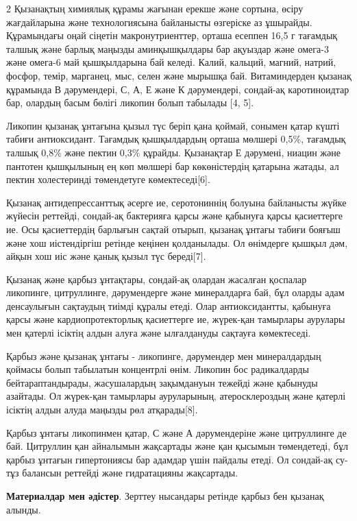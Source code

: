 \begin{multicols}{2}
Қызанақтың химиялық құрамы жағынан ерекше және сортына, өсіру
жағдайларына және технологиясына байланысты өзгеріске аз ұшырайды.
Құрамындағы оңай сіңетін макронутриенттер, орташа есеппен 16,5 г
тағамдық талшық және барлық маңызды аминқышқылдары бар ақуыздар және
омега-3 және омега-6 май қышқылдарына бай келеді. Калий, кальций,
магний, натрий, фосфор, темір, марганец, мыс, селен және мырышқа бай.
Витаминдерден қызанақ құрамында В дәрумендері, С, А, Е және К
дәрумендері, сондай-ақ каротиноидтар бар, олардың басым бөлігі ликопин
болып табылады {[}4, 5{]}.

Ликопин қызанақ ұнтағына қызыл түс беріп қана қоймай, сонымен қатар
күшті табиғи антиоксидант. Тағамдық қышқылдардың орташа мөлшері 0,5\%,
тағамдық талшық 0,8\% және пектин 0,3\% құрайды. Қызанақтар Е дәрумені,
ниацин және пантотен қышқылының ең көп мөлшері бар көкөністердің
қатарына жатады, ал пектин холестеринді төмендетуге көмектеседі{[}6{]}.

Қызанақ антидепрессанттық әсерге ие, серотониннің болуына байланысты
жүйке жүйесін реттейді, сондай-ақ бактерияға қарсы және қабынуға қарсы
қасиеттерге ие. Осы қасиеттердің барлығын сақтай отырып, қызанақ ұнтағы
табиғи бояғыш және хош иістендіргіш ретінде кеңінен қолданылады. Ол
өнімдерге қышқыл дәм, айқын хош иіс және қанық қызыл түс береді{[}7{]}.

Қызанақ және қарбыз ұнтақтары, сондай-ақ олардан жасалған қоспалар
ликопинге, цитруллинге, дәрумендерге және минералдарға бай, бұл оларды
адам денсаулығын сақтаудың тиімді құралы етеді. Олар антиоксидантты,
қабынуға қарсы және кардиопротекторлық қасиеттерге ие, жүрек-қан
тамырлары аурулары мен қатерлі ісіктің алдын алуға және ылғалдануды
сақтауға көмектеседі.

Қарбыз және қызанақ ұнтағы - ликопинге, дәрумендер мен минералдардың
қоймасы болып табылатын концентрлі өнім. Ликопин бос радикалдарды
бейтараптандырады, жасушалардың зақымдануын тежейді және қабынуды
азайтады. Ол жүрек-қан тамырлары ауруларының, атеросклероздың және
қатерлі ісіктің алдын алуда маңызды рөл атқарады{[}8{]}.

Қарбыз ұнтағы ликопинмен қатар, С және А дәрумендеріне және цитруллинге
де бай. Цитруллин қан айналымын жақсартады және қан қысымын төмендетеді,
бұл қарбыз ұнтағын гипертониясы бар адамдар үшін пайдалы етеді. Ол
сондай-ақ су-тұз балансын реттейді және гидратацияны жақсартады.

{\bfseries Материалдар мен әдістер}. Зерттеу нысандары ретінде қарбыз бен
қызанақ алынды.


\end{multicols}
